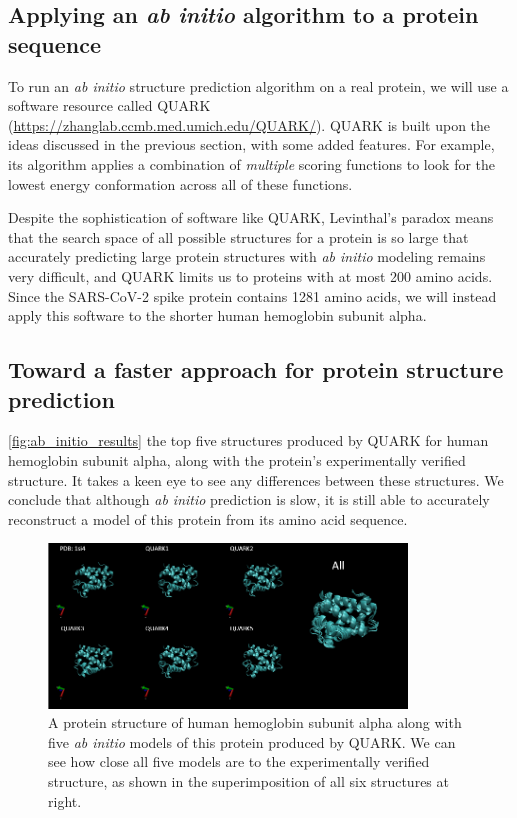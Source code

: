 \FloatBarrier
{}
\subsection{Applying an \textit{ab initio} algorithm to a protein sequence}

To run an \textit{ab initio} structure prediction algorithm on a real protein, we will use a software resource called QUARK (\url{https://zhanglab.ccmb.med.umich.edu/QUARK/}). QUARK is built upon the ideas discussed in the previous section, with some added features. For example, its algorithm applies a combination of \textit{multiple} scoring functions to look for the lowest energy conformation across all of these functions.

Despite the sophistication of software like QUARK, Levinthal's paradox means that the search space of all possible structures for a protein is so large that accurately predicting large protein structures with \textit{ab initio} modeling remains very difficult, and QUARK limits us to proteins with at most 200 amino acids. Since the SARS-CoV-2 spike protein contains 1281 amino acids, we will instead apply this software to the shorter human hemoglobin subunit alpha. 

\FloatBarrier
{}
\subsection{Toward a faster approach for protein structure prediction}

\autoref{fig:ab_initio_results} the top five structures produced by QUARK for human hemoglobin subunit alpha, along with the protein's experimentally verified structure. It takes a keen eye to see any differences between these structures. We conclude that although \textit{ab initio} prediction is slow, it is still able to accurately reconstruct a model of this protein from its amino acid sequence.

\begin{figure}[h]
	\centering
	\mySfFamily
	\includegraphics[width = 0.85\textwidth]{../images/ab_initio_results.png}
	\caption{A protein structure of human hemoglobin subunit alpha along with five \textit{ab initio} models of this protein produced by QUARK. We can see how close all five models are to the experimentally verified structure, as shown in the superimposition of all six structures at right.}
	\label{fig:ab_initio_results}
\end{figure}

